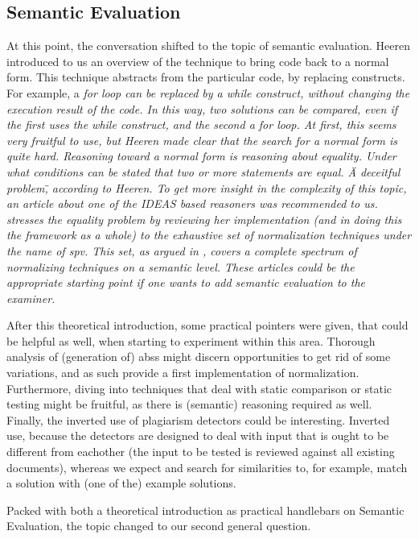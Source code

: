 \subsection{Semantic Evaluation} %
At this point, the conversation shifted to the topic of semantic evaluation.
Heeren introduced to us an overview of the technique to bring code back to a
normal form. This technique abstracts from the particular code, by replacing 
constructs. For example, a \em{for loop} can be replaced by a 
\em{while construct}, without 
changing the execution result of the code. In this way, two solutions can be
compared, even if the first uses the \em{while} construct, and the second a 
\em{for loop}. At first, this seems very fruitful to use, but Heeren made clear
that the search for a normal form is quite hard. Reasoning toward a normal form
is reasoning about equality. Under what conditions can be stated that two or 
more statements are equal. \"A deceitful problem\", according to Heeren. To 
get more insight in the complexity of this topic, an article about one of the
IDEAS based reasoners was recommended to us. \citep{keuning2014strategy} 
stresses the equality problem by reviewing her implementation (and in
doing this the framework as a whole) to the exhaustive set of normalization 
techniques under the name of \gls{spv}. This set, as argued in 
\citep{xu2003transformation}, covers a complete spectrum of normalizing 
techniques on a semantic level. These articles could be the appropriate 
starting point if one wants to add semantic evaluation to the \gls{examiner}.


After this theoretical introduction, some practical pointers were given, that
could be helpful as well, when starting to experiment within this area. 
Thorough analysis of (generation of) \glspl{abs} might discern opportunities 
to get rid of some variations, and as such provide a first implementation of
normalization. %
Furthermore, diving into techniques that deal with static comparison or static
testing might be fruitful, as there is (semantic) reasoning required as well.
Finally, the inverted use of plagiarism detectors could be interesting. 
Inverted use, because the detectors are designed to deal with input that is
ought to be different from eachother (the input to be tested is reviewed 
against all existing documents), whereas we expect and search for similarities to, for example, match a solution with (one of the) example solutions. 


Packed with both a theoretical introduction as practical handlebars on
Semantic Evaluation, the topic changed to our second general question.

